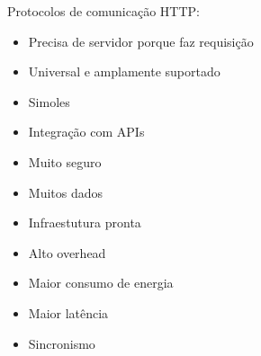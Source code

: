 \begin{frame}{Protocolos de comunicação}
    HTTP:
    \begin{itemize}
        \item Precisa de servidor porque faz requisição
        \item Universal e amplamente suportado
        \item Simoles
        \item Integração com APIs
        \item Muito seguro
        \item Muitos dados
        \item Infraestutura pronta
        \item Alto overhead
        \item Maior consumo de energia
        \item Maior latência
        \item Sincronismo
    \end{itemize}
\end{frame}
